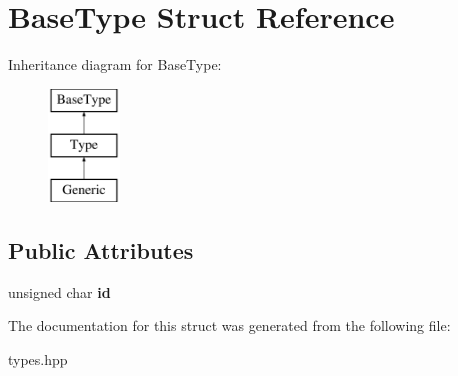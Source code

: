 \hypertarget{structBaseType}{
\section{BaseType Struct Reference}
\label{structBaseType}
}
Inheritance diagram for BaseType:\begin{figure}[H]
\begin{center}
\leavevmode
\includegraphics[height=3.000000cm]{structBaseType}
\end{center}
\end{figure}
\subsection*{Public Attributes}
\begin{DoxyCompactItemize}
\item 
\hypertarget{structBaseType_a520f7102b6261113b5f601b2247b7f55}{
unsigned char {\bfseries id}}
\label{structBaseType_a520f7102b6261113b5f601b2247b7f55}

\end{DoxyCompactItemize}


The documentation for this struct was generated from the following file:\begin{DoxyCompactItemize}
\item 
types.hpp\end{DoxyCompactItemize}
